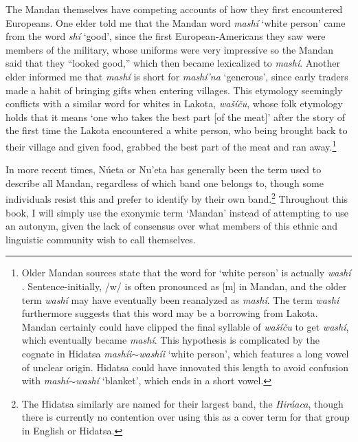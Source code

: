 The Mandan themselves have competing accounts of how they first encountered Europeans. One elder told me that the Mandan word \textit{mashí} `white person' came from the word \textit{shí} `good', since the first European-Americans they saw were members of the military, whose uniforms were very impressive so the Mandan said that they ``looked good,'' which then became lexicalized to \textit{mashí}. Another elder informed me that \textit{mashí} is short for \textit{mashí'na} `generous', since early traders made a habit of bringing gifts when entering villages. This etymology seemingly conflicts with a similar word for whites in Lakota, \textit{wašíču}, whose folk etymology holds that it means `one who takes the best part [of the meat]' after the story of the first time the Lakota encountered a white person, who being brought back to their village and given food, grabbed the best part of the meat and ran away.\footnote{Older Mandan sources state that the word for `white person' is actually \textit{washí} \citep{kipp1852}. Sentence-initially, /w/ is often pronounced as [m] in Mandan, and the older term \textit{washí} may have eventually been reanalyzed as \textit{mashí}. The term \textit{washí} furthermore suggests that this word may be a borrowing from Lakota. Mandan certainly could have clipped the final syllable of \textit{wašíču} to get \textit{washí}, which eventually became \textit{mashí}. This hypothesis is complicated by the cognate in Hidatsa \textit{mashíi}$\sim$\textit{washíi} `white person', which features a long vowel of unclear origin. Hidatsa could have innovated this length to avoid confusion with \textit{mashí}$\sim$\textit{washí} `blanket', which ends in a short vowel.}

In more recent times, Núeta or Nu'eta has generally been the term used to describe all Mandan, regardless of which band one belongs to, though some individuals resist this and prefer to identify by their own band.\footnote{The Hidatsa similarly are named for their largest band, the \textit{Hiráaca}, though there is currently no contention over using this as a cover term for that group in English or Hidatsa.} Throughout this book, I will simply use the exonymic term `Mandan' instead of attempting to use an autonym, given the lack of consensus over what members of this ethnic and linguistic community wish to call themselves.

